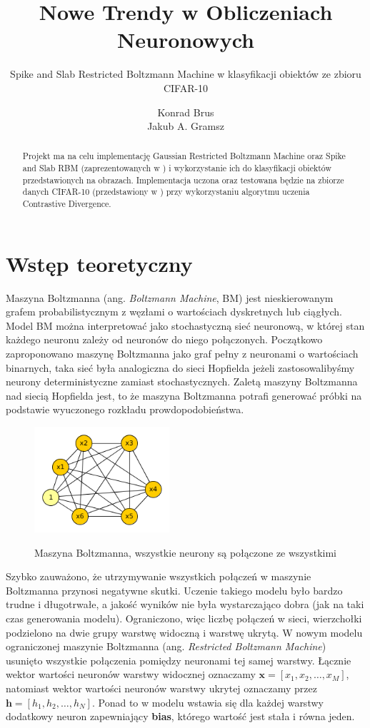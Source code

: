 \documentclass[a4paper,10pt]{article} %
\title{Nowe Trendy w Obliczeniach Neuronowych}
\subtitle{Spike and Slab Restricted Boltzmann Machine w klasyfikacji obiektów ze zbioru CIFAR-10}
\author{Konrad Brus \\ Jakub A. Gramsz}
\begin{document}
\maketitle

\begin{abstract}
Projekt ma na celu implementację Gaussian Restricted Boltzmann Machine oraz Spike and Slab RBM (zaprezentowanych w \cite{courville2013spike}) i wykorzystanie ich do klasyfikacji obiektów przedstawionych na obrazach. Implementacja uczona oraz testowana będzie na zbiorze danych CIFAR-10 (przedstawiony w \cite{cifar}) przy wykorzystaniu algorytmu uczenia Contrastive Divergence.
\end{abstract}

\section{Wstęp teoretyczny}
Maszyna Boltzmanna (ang. \textit{Boltzmann Machine}, BM) jest nieskierowanym grafem probabilistycznym z
węzłami o wartościach dyskretnych lub ciągłych. Model BM można interpretować jako stochastyczną sieć
neuronową, w której stan każdego neuronu zależy od neuronów do niego połączonych. Początkowo
zaproponowano maszynę Boltzmanna jako graf pełny z neuronami o wartościach binarnych, taka sieć była
analogiczna do sieci Hopfielda jeżeli zastosowalibyśmy neurony deterministyczne zamiast stochastycznych.
Zaletą maszyny Boltzmanna nad siecią Hopfielda jest, to że maszyna Boltzmanna potrafi generować próbki
na podstawie wyuczonego rozkładu prowdopodobieństwa.

\begin{figure}
 \centering
 \includegraphics[width=5cm]{imgs/bm.png}
 \label{fig:bm}
\caption{Maszyna Boltzmanna, wszystkie neurony są połączone ze wszystkimi}
\end{figure} 

Szybko zauważono, że utrzymywanie wszystkich połączeń w maszynie Boltzmanna przynosi negatywne skutki.
Uczenie takiego modelu było bardzo trudne i długotrwałe, a jakość wyników nie była wystarczająco dobra
(jak na taki czas generowania modelu). Ograniczono, więc liczbę połączeń w sieci, wierzchołki podzielono
na dwie grupy warstwę widoczną i warstwę ukrytą. W nowym modelu ograniczonej maszynie Boltzmanna (ang.
\textit{Restricted Boltzmann Machine}) usunięto wszystkie połączenia pomiędzy neuronami tej samej
warstwy. Łącznie wektor wartości neuronów warstwy widocznej oznaczamy $\mathbf{x}=[x_1, x_2,\dots, x_M]$,
natomiast wektor wartości neuronów warstwy ukrytej oznaczamy przez $\mathbf{h}=[h_1, h_2,\dots, h_N]$.
Ponad to w modelu wstawia się dla każdej warstwy dodatkowy neuron zapewniający \textbf{bias}, którego
wartość jest stała i równa jeden.
\end{document}
